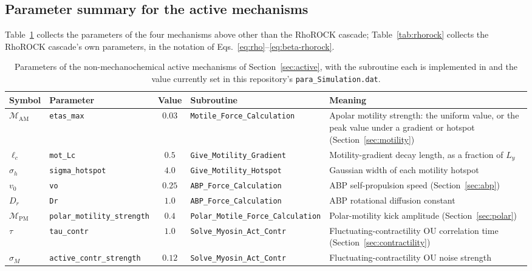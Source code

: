 \documentclass[11pt]{article}
\begin{document}
\subsection{Parameter summary for the active mechanisms}
\label{sec:active-params}
Table~\ref{tab:activity} collects the parameters of the four mechanisms above other
than the RhoROCK cascade; Table~\ref{tab:rhorock} collects the RhoROCK cascade's own
parameters, in the notation of Eqs.~\eqref{eq:rho}--\eqref{eq:beta-rhorock}.

\begin{table}[htbp]
\centering
\footnotesize
\begin{tabular}{@{}lp{2.1cm}cp{2.5cm}p{4.6cm}@{}}
\toprule
Symbol & Parameter & Value & Subroutine & Meaning \\
\midrule
$\mathcal M_{\mathrm{AM}}$ & \texttt{etas\_max} & $0.03$ & \texttt{Motile\_\allowbreak Force\_\allowbreak Calculation} &
Apolar motility strength: the uniform value, or the peak value under a gradient or
hotspot (Section~\ref{sec:motility}) \\
$\ell_c$ & \texttt{mot\_Lc} & $0.5$ & \texttt{Give\_\allowbreak Motility\_\allowbreak Gradient} &
Motility-gradient decay length, as a fraction of $L_y$ \\
$\sigma_h$ & \texttt{sigma\_hotspot} & $4.0$ & \texttt{Give\_\allowbreak Motility\_\allowbreak Hotspot} &
Gaussian width of each motility hotspot \\
$v_0$ & \texttt{vo} & $0.25$ & \texttt{ABP\_\allowbreak Force\_\allowbreak Calculation} & ABP self-propulsion speed
(Section~\ref{sec:abp}) \\
$D_r$ & \texttt{Dr} & $1.0$ & \texttt{ABP\_\allowbreak Force\_\allowbreak Calculation} & ABP rotational diffusion
constant \\
$\mathcal M_{\mathrm{PM}}$ & \texttt{polar\_\allowbreak motility\_\allowbreak strength} & $0.4$ & \texttt{Polar\_\allowbreak Motile\_\allowbreak Force\_\allowbreak Calculation} &
Polar-motility kick amplitude (Section~\ref{sec:polar}) \\
$\tau$ & \texttt{tau\_contr} & $1.0$ & \texttt{Solve\_\allowbreak Myosin\_\allowbreak Act\_\allowbreak Contr} & Fluctuating-contractility
OU correlation time (Section~\ref{sec:contractility}) \\
$\sigma_M$ & \texttt{active\_\allowbreak contr\_\allowbreak strength} & $0.12$ & \texttt{Solve\_\allowbreak Myosin\_\allowbreak Act\_\allowbreak Contr} &
Fluctuating-contractility OU noise strength \\
\bottomrule
\end{tabular}
\normalsize
\caption{Parameters of the non-mechanochemical active mechanisms of
Section~\ref{sec:active}, with the subroutine each is implemented in and the value
currently set in this repository's \texttt{para\_Simulation.dat}.}
\label{tab:activity}
\end{table}
\end{document}
